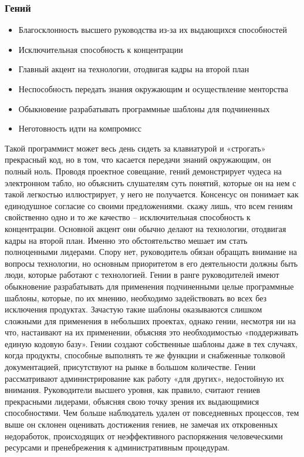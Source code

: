\documentclass{../industrial-development}
\begin{document}
{\begin{frame} \frametitle{Гений}
\begin{itemize}
		\item Благосклонность высшего руководства из-за их выдающихся способностей
		\item Исключительная способность к концентрации
		\item Главный акцент на технологии, отодвигая кадры на второй план
		\item Неспособность передать знания окружающим и осуществление менторства
		\item Обыкновение разрабатывать программные шаблоны для  подчиненных 
		\item Неготовность идти на компромисс				
	\end{itemize}
\end{frame}
\lecturenotes
Такой программист может весь день сидеть за клавиатурой и «строгать» прекрасный код, но в том, что касается передачи знаний окружающим, он полный ноль. Проводя проектное совещание, гений демонстрирует чудеса на электронном табло, но объяснить слушателям суть понятий, которые он на нем с такой легкостью иллюстрирует, у него не получается. Консенсус он понимает как единодушное согласие со своими предложениями. скажу лишь, что всем гениям свойственно одно и то же качество – исключительная способность к концентрации. 
Основной акцент они обычно делают на технологии, отодвигая кадры на второй план. Именно это обстоятельство мешает им стать полноценными лидерами. Спору нет, руководитель обязан обращать внимание на вопросы технологии, но основным приоритетом в его деятельности должны быть люди, которые работают с технологией. Гении в ранге руководителей имеют обыкновение разрабатывать для применения подчиненными целые программные шаблоны, которые, по их мнению, необходимо задействовать во всех без исключения продуктах. Зачастую такие шаблоны оказываются слишком сложными для применения в небольших проектах, однако гении, несмотря ни на что, настаивают на их применении, объясняя это необходимостью «поддерживать единую кодовую базу». Гении создают собственные шаблоны даже в тех случаях, когда продукты, способные выполнять те же функции и снабженные толковой документацией, присутствуют на рынке в большом количестве. 
Гении рассматривают администрирование как работу «для других», недостойную их внимания. Руководители высшего уровня, как правило, считают гениев прекрасными лидерами, объясняя свою точку зрения их выдающимися способностями. Чем больше наблюдатель удален от повседневных процессов, тем выше он склонен оценивать достижения гениев, не замечая их откровенных недоработок, происходящих от неэффективного распоряжения человеческими ресурсами и пренебрежения к административным процедурам. 



}
\end{document}
